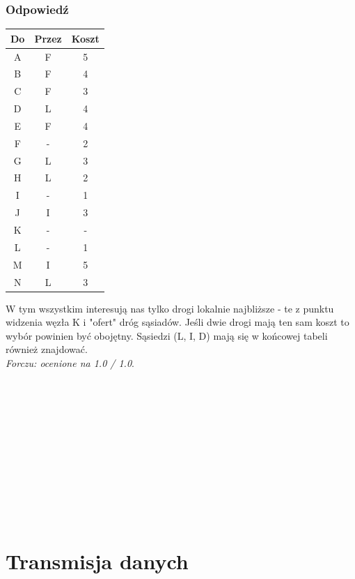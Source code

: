 		\subsubsection{Odpowiedź}
		\begin{table}
			\begin{tabular}{c|c|c}
				Do & Przez & Koszt \\ \hline
				A  & F     & 5     \\
				B  & F     & 4     \\
				C  & F     & 3     \\
				D  & L     & 4     \\
				E  & F     & 4     \\
				F  & -     & 2     \\
				G  & L     & 3     \\
				H  & L     & 2     \\
				I  & -     & 1     \\
				J  & I     & 3     \\
				K  & -     & -     \\
				L  & -     & 1     \\
				M  & I     & 5     \\
				N  & L     & 3    
			\end{tabular}
		\end{table}
		W tym wszystkim interesują nas tylko drogi lokalnie najbliższe - te z punktu widzenia węzła K i "ofert" dróg sąsiadów. Jeśli dwie drogi mają ten sam koszt to wybór powinien być obojętny. Sąsiedzi (L, I, D) mają się w końcowej tabeli również znajdować.\\
		\small{ \emph{Forczu: ocenione na 1.0 / 1.0}}.\\\\\\\\\\\\\\\\\\\\\\\\
		
\newpage
\section{Transmisja danych}
